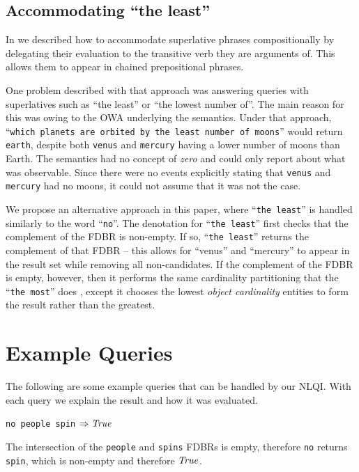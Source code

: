 \documentclass[../main.tex]{subfiles}
\begin{document}
\begin{refsection}
\subsection{Accommodating ``the least''} %

In \cite{frostpeelar2019} we described how to accommodate superlative phrases compositionally by
delegating their evaluation to the transitive verb they are arguments of.  This allows them to appear in chained prepositional phrases.

One problem described with that approach was answering queries with superlatives such as ``the least'' or ``the lowest number of''.  The main reason for this was owing to the OWA underlying the semantics.  Under that approach, ``\texttt{which planets are orbited by the least number of moons}'' would return \texttt{earth}, despite both \texttt{venus} and \texttt{mercury} having a lower number of moons than Earth.  The semantics had no concept of \textit{zero} and could only report about what was observable.  Since there were no events explicitly stating that \texttt{venus} and \texttt{mercury} had no moons, it could not assume that it was not the case.

We propose an alternative approach in this paper, where ``\texttt{the least}'' is handled similarly to the word ``\texttt{no}''.  The denotation for ``\texttt{the least}'' first checks that the complement of the FDBR is non-empty.  If so, ``\texttt{the least}'' returns the complement of that FDBR -- this allows for ``venus'' and ``mercury'' to appear in the result set while removing all non-candidates.  If the complement of the FDBR is empty, however, then it performs the same cardinality partitioning that the ``\texttt{the most}'' does \cite{frostpeelar2019}, except it chooses the lowest {\em object cardinality} entities to form the result rather than the greatest.

\section{Example Queries}
\label{sec:examples}
\noindent The following are some example queries that can be handled by our NLQI.  With each query
we explain the result and how it was evaluated.

\examplespacing

\texttt{no people spin} $\Rightarrow \operatorname{\mathit{True}}$

\examplespacing

\noindent The intersection of the \texttt{people} and \texttt{spins} FDBRs is empty, therefore \texttt{no} returns \texttt{spin}, which is non-empty and therefore $\operatorname{\mathit{True}}$.


\end{refsection}
\end{document}
